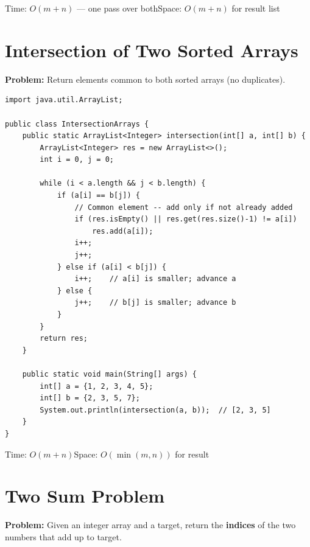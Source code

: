 \documentclass[12pt,a4paper,oneside]{book}
\begin{document}
\begin{complexity}
Time: $O(m + n)$ --- one pass over both\quad Space: $O(m + n)$ for result list
\end{complexity}

\section{Intersection of Two Sorted Arrays}

\textbf{Problem:} Return elements common to both sorted arrays (no duplicates).

\begin{lstlisting}[caption={Intersection of Two Sorted Arrays --- Two Pointer}]
import java.util.ArrayList;

public class IntersectionArrays {
    public static ArrayList<Integer> intersection(int[] a, int[] b) {
        ArrayList<Integer> res = new ArrayList<>();
        int i = 0, j = 0;

        while (i < a.length && j < b.length) {
            if (a[i] == b[j]) {
                // Common element -- add only if not already added
                if (res.isEmpty() || res.get(res.size()-1) != a[i])
                    res.add(a[i]);
                i++;
                j++;
            } else if (a[i] < b[j]) {
                i++;    // a[i] is smaller; advance a
            } else {
                j++;    // b[j] is smaller; advance b
            }
        }
        return res;
    }

    public static void main(String[] args) {
        int[] a = {1, 2, 3, 4, 5};
        int[] b = {2, 3, 5, 7};
        System.out.println(intersection(a, b));  // [2, 3, 5]
    }
}
\end{lstlisting}

\begin{complexity}
Time: $O(m + n)$\quad Space: $O(\min(m,n))$ for result
\end{complexity}

\section{Two Sum Problem}

\textbf{Problem:} Given an integer array and a target, return the \textbf{indices} of the two numbers that add up to target.
\end{document}
